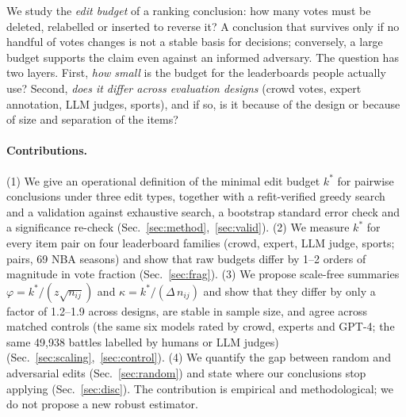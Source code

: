 \documentclass{article}
\newcommand{\nij}{n_{ij}}
\newcommand{\kstar}{k^\ast}
\begin{document}
We study the \emph{edit budget} of a ranking conclusion: how many votes must be deleted, relabelled or inserted to reverse it? A conclusion that survives only if no handful of votes changes is not a stable basis for decisions; conversely, a large budget supports the claim even against an informed adversary. The question has two layers. First, \emph{how small} is the budget for the leaderboards people actually use? Second, \emph{does it differ across evaluation designs} (crowd votes, expert annotation, LLM judges, sports), and if so, is it because of the design or because of size and separation of the items?

\paragraph{Contributions.}
(1) We give an operational definition of the minimal edit budget $\kstar$ for pairwise conclusions under three edit types, together with a refit-verified greedy search and a validation against exhaustive search, a bootstrap standard error check and a significance re-check (Sec.~\ref{sec:method},~\ref{sec:valid}).
(2) We measure $\kstar$ for every item pair on four leaderboard families (crowd, expert, LLM judge, sports; \Nnpairsmain{} pairs, 69 NBA seasons) and show that raw budgets differ by 1--2 orders of magnitude in vote fraction (Sec.~\ref{sec:frag}).
(3) We propose scale-free summaries $\varphi=\kstar/(z\sqrt{\nij})$ and $\kappa=\kstar/(\Delta\,\nij)$ and show that they differ by only a factor of 1.2--1.9 across designs, are stable in sample size, and agree across matched controls (the same six models rated by crowd, experts and GPT-4; the same 49,938 battles labelled by humans or LLM judges) (Sec.~\ref{sec:scaling},~\ref{sec:control}).
(4) We quantify the gap between random and adversarial edits (Sec.~\ref{sec:random}) and state where our conclusions stop applying (Sec.~\ref{sec:disc}).
The contribution is empirical and methodological; we do not propose a new robust estimator.
\end{document}
